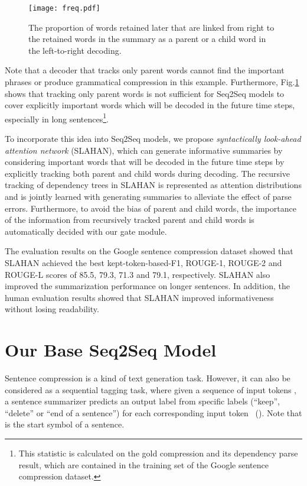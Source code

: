 \documentclass[letterpaper]{article} \usepackage{aaai20}  \usepackage{times}  \usepackage{helvet} \usepackage{courier}  \usepackage[hyphens]{url}  \usepackage{graphicx} \urlstyle{rm} \def\UrlFont{\rm}  \usepackage{graphicx}  \frenchspacing  \setlength{\pdfpagewidth}{8.5in}  \setlength{\pdfpageheight}{11in}  \usepackage{tabu}
\begin{document}
\begin{figure}[t]
    \centering
    \texttt{[image: freq.pdf]}
    \caption{The proportion of words retained later that are linked from right to the retained words in the summary as a parent or a child word in the left-to-right decoding.\label{fig:length}}
\end{figure}

Note that a decoder that tracks only parent words cannot
find the important phrases or produce grammatical compression in this example.
Furthermore, Fig.\ref{fig:length} shows that tracking only parent words is not sufficient for Seq2Seq models to cover explicitly important words which will be decoded in the future time steps, especially in long sentences\footnote{This statistic is calculated on the gold compression and its dependency parse result, which are contained in the training set of the Google sentence compression dataset.}.

To incorporate this idea into Seq2Seq models, we propose \textit{syntactically look-ahead attention network} (SLAHAN), which can generate informative summaries by considering important words that will be decoded in the future time steps by explicitly tracking both parent and child words during decoding. 
The recursive tracking of dependency trees in SLAHAN is represented as attention distributions and is jointly learned with generating summaries to alleviate the effect of parse errors.
Furthermore, to avoid the bias of parent and child words, the importance of the information from recursively tracked parent and child words is automatically decided with our gate module.

The evaluation results on the Google sentence compression
dataset showed that SLAHAN achieved the best kept-token-based-F1, ROUGE-1, ROUGE-2 and ROUGE-L scores of 85.5, 79.3, 71.3 and 79.1, respectively.
SLAHAN also improved the summarization performance on longer sentences.
In addition, the human evaluation results showed that SLAHAN improved informativeness without losing readability.

\section{Our Base Seq2Seq Model\label{sec:base}}

Sentence compression is a kind of text generation task.
However, it can also be considered as a sequential tagging task, where given a sequence of input tokens , a sentence summarizer predicts an output label  from specific labels (``keep'', ``delete'' or ``end of a sentence'') for each corresponding input token ~(). Note that  is the start symbol of a sentence.
\end{document}
